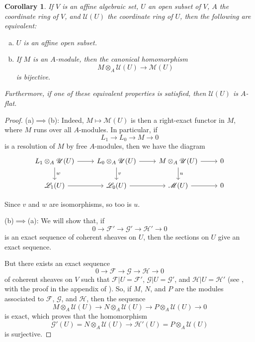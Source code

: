 \documentclass{article}
\theoremstyle{plain}
\newtheorem*{corollary}{Corollary}
\newcommand{\sh}{\mathscr}
\newcommand{\oldpage}[1]{\marginpar{\footnotesize$\Big\vert$ \textit{p.~#1}}}
\begin{document}
\begin{corollary}
  If $V$ is an affine algebraic set, $U$ an open subset of $V$, $A$ the coordinate ring of $V$, and $\sh{U}(U)$ the coordinate ring of $U$, then the following are equivalent:
  \begin{enumerate}[(a)]
    \item $U$ is an affine open subset.
    \item If $M$ is an $A$-module, then the canonical homomorphism
      \[
        M\otimes_A\sh{U}(U) \to \sh{M}(U)
      \]
      is bijective.
  \end{enumerate}

\oldpage{2-08}
  Furthermore, if one of these equivalent properties is satisfied, then $\sh{U}(U)$ is $A$-flat.
\end{corollary}

\begin{proof}
  (a)$\implies$(b):
  Indeed, $M\mapsto\sh{M}(U)$ is then a right-exact functor in $M$, where $M$ runs over all $A$-modules.
  In particular, if
  \[
    L_1 \to L_0 \to M \to 0
  \]
  is a resolution of $M$ by free $A$-modules, then we have the diagram
  \[
    \begin{tikzcd}
      L_1\otimes_A\sh{U}(U) \rar \dar["w"]
      & L_0\otimes_A\sh{U}(U) \rar \dar["v"]
      & M\otimes_A\sh{U}(U) \rar \dar["u"]
      & 0
    \\\sh{L}_1(U) \rar
      & \sh{L}_0(U) \rar
      & \sh{M}(U) \rar
      & 0
    \end{tikzcd}
  \]

  Since $v$ and $w$ are isomorphisms, so too is $u$.

  \bigskip
  (b)$\implies$(a):
  We will show that, if
  \[
    0 \to \sh{F}' \to\sh{G}' \to \sh{H}' \to 0
  \]
  is an exact sequence of coherent sheaves on $U$, then the sections on $U$ give an exact sequence.

  But there exists an exact sequence
  \[
    0 \to \sh{F} \to \sh{G} \to \sh{H} \to 0
  \]
  of coherent sheaves on $V$ such that $\sh{F}|U=\sh{F}'$, $\sh{G}|U=\sh{G}'$, and $\sh{H}|U=\sh{H}'$ (see \cite{1}, with the proof in the appendix of \cite{2}).
  So, if $M$, $N$, and $P$ are the modules associated to $\sh{F}$, $\sh{G}$, and $\sh{H}$, then the sequence
  \[
    M\otimes_A\sh{U}(U) \to N\otimes_A\sh{U}(U) \to P\otimes_A\sh{U}(U) \to 0
  \]
  is exact, which proves that the homomorphism
  \[
    \sh{G}'(U) = N\otimes_A\sh{U}(U) \to \sh{H}'(U) = P\otimes_A\sh{U}(U)
  \]
  is surjective.
\end{proof}
\end{document}
